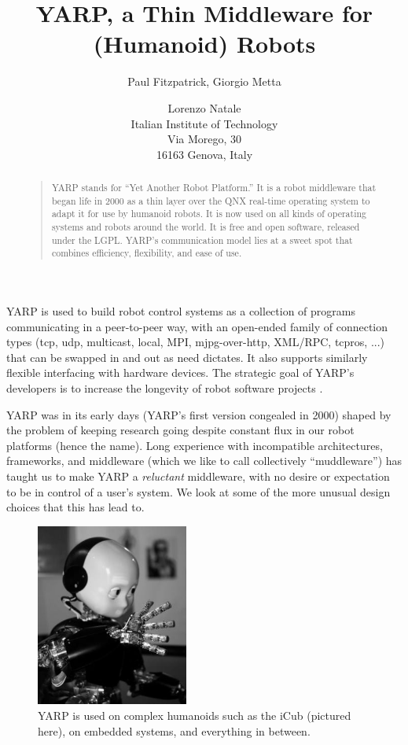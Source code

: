 \documentclass[letterpaper]{article}
\title{YARP, a Thin Middleware for (Humanoid) Robots}
\author{Paul Fitzpatrick{\rm ,} Giorgio Metta \and Lorenzo Natale \\
Italian Institute of Technology \\
Via Morego, 30 \\16163 Genova, Italy}
\begin{document}
 
\maketitle
\begin{abstract}
\begin{quote}

YARP stands for ``Yet Another Robot Platform.''  It is a robot
middleware that began life in 2000 as a thin layer over the QNX
real-time operating system to adapt it for use by humanoid robots.  It
is now used on all kinds of operating systems and robots around the
world.  It is free and open software, released under the LGPL.
YARP's communication model lies at a sweet spot that combines
efficiency, flexibility, and ease of use.

\end{quote}
\end{abstract}

\noindent 

YARP is used to build robot control systems as a collection of
programs communicating in a peer-to-peer way, with an open-ended
family of connection types (tcp, udp, multicast, local, MPI,
mjpg-over-http, XML/RPC, tcpros, ...) that can be swapped in and out
as need dictates.
It also supports similarly flexible interfacing
with hardware devices.  The strategic goal
of YARP's developers is to increase the longevity
of robot software projects \cite{fitzpatrick08towards}.

YARP was in its early days (YARP's first version congealed in 2000)
shaped by the problem of keeping research going despite constant flux
in our robot platforms (hence the name).  Long experience with
incompatible architectures, frameworks, and middleware (which we like
to call collectively ``muddleware'') has taught us to make YARP a {\it
  reluctant} middleware, with no desire or expectation to be in
control of a user's system.  We look at some of the more unusual
design choices that this has lead to.  

\begin{figure}
\centerline{\includegraphics[width=5cm]{icub.jpg}}
\caption{YARP is used on
complex humanoids such as the iCub (pictured here),
on embedded systems, and everything in between.
} 
\end{figure}
\end{document}
